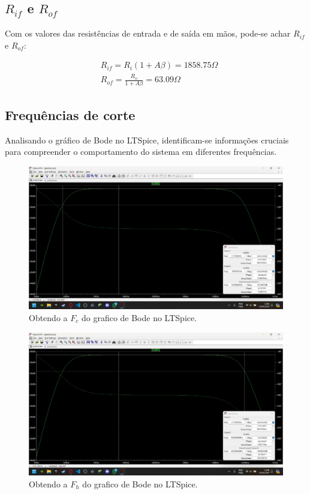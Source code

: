\subsection{$R_{if}$ e $R_{of}$}

Com os valores das resistências de entrada e de saída em mãos, pode-se achar $R_{if}$ e $R_{of}$:

\begin{equation}
    \begin{aligned}
         & R_{if} = R_i (1 + A \beta) = 1858.75 \varOmega     \\
         & R_{of} = \frac{R_o}{1 + A \beta} = 63.09 \varOmega
    \end{aligned}
\end{equation}

\subsection{Frequências de corte}

Analisando o gráfico de Bode no LTSpice, identificam-se informações cruciais para compreender o comportamento do sistema em diferentes frequências.

\begin{figure}[h]
    \centering
    \includegraphics[width=0.8\columnwidth]{Images/fc.jpeg}
    \caption{Obtendo a $F_c$ do grafico de Bode no LTSpice.}
\end{figure}

\begin{figure}[h]
    \centering
    \includegraphics[width=0.8\columnwidth]{Images/fh.jpeg}
    \caption{Obtendo a $F_h$ do grafico de Bode no LTSpice.}
\end{figure}
